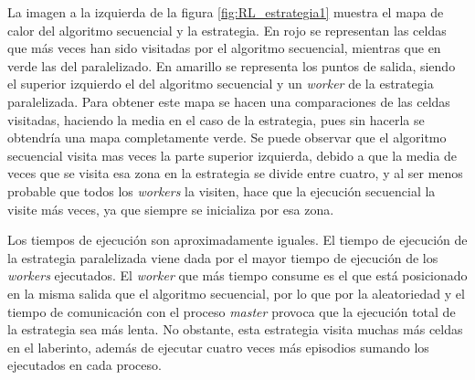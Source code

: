 		La imagen a la izquierda de la figura \ref{fig:RL_estrategia1} muestra el mapa de calor del algoritmo secuencial y la estrategia. En rojo se representan las celdas que más veces han sido visitadas por el algoritmo secuencial, mientras que en verde las del paralelizado. En amarillo se representa los puntos de salida, siendo el superior izquierdo el del algoritmo secuencial y un \textit{worker} de la estrategia paralelizada. Para obtener este mapa se hacen una comparaciones de las celdas visitadas, haciendo la media en el caso de la estrategia, pues sin hacerla se obtendría una mapa completamente verde. Se puede observar que el algoritmo secuencial visita mas veces la parte superior izquierda, debido a que la media de veces que se visita esa zona en la estrategia se divide entre cuatro, y al ser menos probable que todos los \textit{workers} la visiten, hace que la ejecución secuencial la visite más veces, ya que siempre se inicializa por esa zona. 
		
		Los tiempos de ejecución son aproximadamente iguales. El tiempo de ejecución de la estrategia paralelizada viene dada por el mayor tiempo de ejecución de los \textit{workers} ejecutados. El \textit{worker} que más tiempo consume es el que está posicionado en la misma salida que el algoritmo secuencial, por lo que por la aleatoriedad y el tiempo de comunicación con el proceso \textit{master} provoca que la ejecución total de la estrategia sea más lenta. No obstante, esta estrategia visita muchas más celdas en el laberinto, además de ejecutar cuatro veces más episodios sumando los ejecutados en cada proceso.		
		
